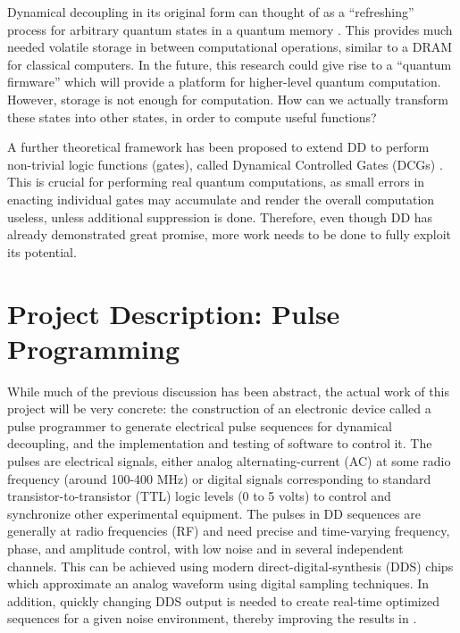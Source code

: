 \documentclass{article}
\begin{document}
Dynamical decoupling in its original form can thought of as a ``refreshing'' process for arbitrary
quantum states
in a quantum memory \cite{BUVSIB2009c}. This provides much needed volatile storage in between
computational operations, similar to a DRAM for classical computers. In the
future, this research could give rise to a ``quantum firmware'' which will
provide a platform for higher-level quantum computation.
However, storage is not enough for computation. How can
we actually transform these states into other states, in order to compute
useful functions?

A further theoretical framework has been proposed to extend DD to 
perform non-trivial logic functions (gates),
called Dynamical Controlled Gates (DCGs)
\cite{Khodjasteh2009}.
This is crucial for performing real quantum computations, as small errors in
enacting individual gates may accumulate and render
the overall computation useless, unless additional suppression is done.
Therefore, even though DD has already demonstrated great promise, more work
needs to be done to fully exploit its potential.

\section{Project Description: Pulse Programming}

While much of the previous discussion has been abstract, the actual work of
this project will be very concrete: the construction of an electronic
device called a pulse programmer to generate electrical pulse sequences
for dynamical decoupling,
and the implementation and testing of software to control it. The pulses
are electrical signals, either analog alternating-current (AC) at some
radio frequency (around 100-400 MHz) or digital signals corresponding to
standard transistor-to-transistor (TTL) logic levels (0 to 5 volts) to control
and synchronize other experimental equipment.
The pulses in DD sequences are generally at radio frequencies (RF) 
and need precise and time-varying
frequency, phase, and amplitude control, with low noise and in several
independent channels. This can be achieved using modern direct-digital-synthesis
(DDS) chips which approximate an analog waveform using digital sampling
techniques. In addition, quickly changing DDS output is needed to create
real-time optimized sequences for a given noise environment, thereby
improving the results in \cite{BUVSIB2009c}.
\end{document}
